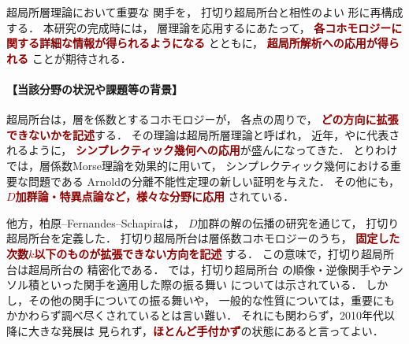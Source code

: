\documentclass[11pt,a4paper,uplatex,dvipdfmx]{ujarticle} 		%
\newcommand{\研究課題名}{打切り超局所台の関手的性質の研究とMorse理論への応用}
\newcommand{\研究機関名}{北海道大学}
\newcommand{\研究代表者氏名}{大柴寿浩}
\begin{document}
超局所層理論において重要な
関手を，
打切り超局所台と相性のよい
形に再構成する．%
本研究の完成時には，
層理論を応用するにあたって，
\textcolor{darkred}{
	\textbf{%
		各コホモロジーに関する詳細な情報が得られるようになる}%
}とともに，
\textcolor{darkred}{
	\textbf{超局所解析への応用が得られる}
}ことが期待される．
\vspace{-16pt}
\paragraph{【当該分野の状況や課題等の背景】}
超局所台は，層を係数とするコホモロジーが，
各点の周りで，
\textcolor{darkred}{\textbf{どの方向に拡張できないかを記述}}する．
その理論は超局所層理論と呼ばれ，
近年，\cite{Nad09,NZ09}や\cite{Tam18}に代表されるように，
\textcolor{darkred}{\textbf{シンプレクティック幾何への応用}}が盛んになってきた．
とりわけ\cite{GKS12}では，層係数Morse理論を効果的に用いて，
シンプレクティック幾何における重要な問題である
Arnoldの分離不能性定理の新しい証明を与えた．
その他にも，\textcolor{darkred}{
	\textbf{\(D\)加群論・特異点論など，様々な分野に応用}
}されている．

他方，柏原--Fernandes--Schapira\cite{KMS03}は，
\(D\)加群の解の伝播の研究を通じて，
打切り超局所台を定義した．
打切り超局所台は層係数コホモロジーのうち，\textcolor{darkred}{
	\textbf{固定した次数\(k\)以下のものが拡張できない方向を記述}
}する．
この意味で，打切り超局所台は超局所台の
精密化である．
\cite{KMS03}では，打切り超局所台
の順像・逆像関手やテンソル積といった関手を適用した際の振る舞い
については示されている．%
しかし，その他の関手についての振る舞いや，
一般的な性質については，重要にもかかわらず調べ尽くされているとは言い難い．
それにも関わらず，2010年代以降に大きな発展は
見られず，\textcolor{darkred}{\textbf{ほとんど手付かず}}の状態にあると言ってよい．
\end{document}
